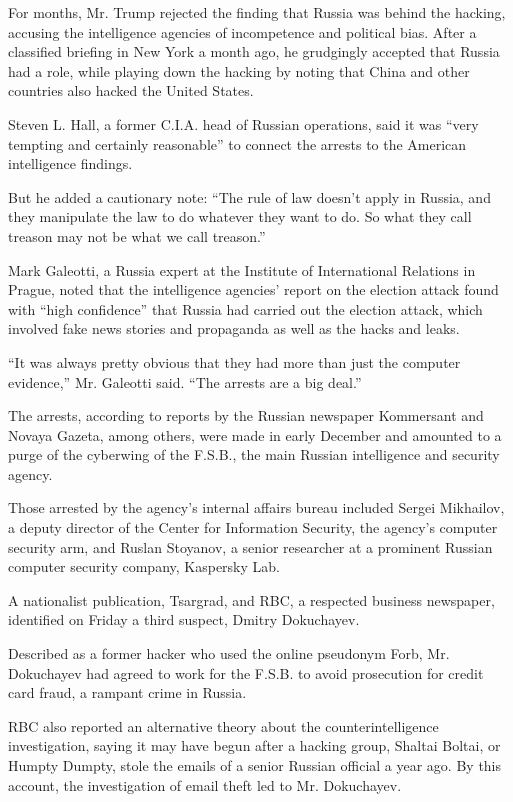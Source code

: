 For months, Mr. Trump rejected the finding that Russia was behind the
hacking, accusing the intelligence agencies of incompetence and
political bias. After a classified briefing in New York a month ago, he
grudgingly accepted that Russia had a role, while playing down the
hacking by noting that China and other countries also hacked the United
States.

Steven L. Hall, a former C.I.A. head of Russian operations, said it was
``very tempting and certainly reasonable'' to connect the arrests to the
American intelligence findings.

But he added a cautionary note: ``The rule of law doesn't apply in
Russia, and they manipulate the law to do whatever they want to do. So
what they call treason may not be what we call treason.''

Mark Galeotti, a Russia expert at the Institute of International
Relations in Prague, noted that the intelligence agencies' report on the
election attack found with ``high confidence'' that Russia had carried
out the election attack, which involved fake news stories and propaganda
as well as the hacks and leaks.

``It was always pretty obvious that they had more than just the computer
evidence,'' Mr. Galeotti said. ``The arrests are a big deal.''

The arrests, according to reports by the Russian newspaper Kommersant
and Novaya Gazeta, among others, were made in early December and
amounted to a purge of the cyberwing of the F.S.B., the main Russian
intelligence and security agency.

Those arrested by the agency's internal affairs bureau included Sergei
Mikhailov, a deputy director of the Center for Information Security, the
agency's computer security arm, and Ruslan Stoyanov, a senior researcher
at a prominent Russian computer security company, Kaspersky Lab.

A nationalist publication, Tsargrad, and RBC, a respected business
newspaper, identified on Friday a third suspect, Dmitry Dokuchayev.

Described as a former hacker who used the online pseudonym Forb, Mr.
Dokuchayev had agreed to work for the F.S.B. to avoid prosecution for
credit card fraud, a rampant crime in Russia.

RBC also reported an alternative theory about the counterintelligence
investigation, saying it may have begun after a hacking group, Shaltai
Boltai, or Humpty Dumpty, stole the emails of a senior Russian official
a year ago. By this account, the investigation of email theft led to Mr.
Dokuchayev.

